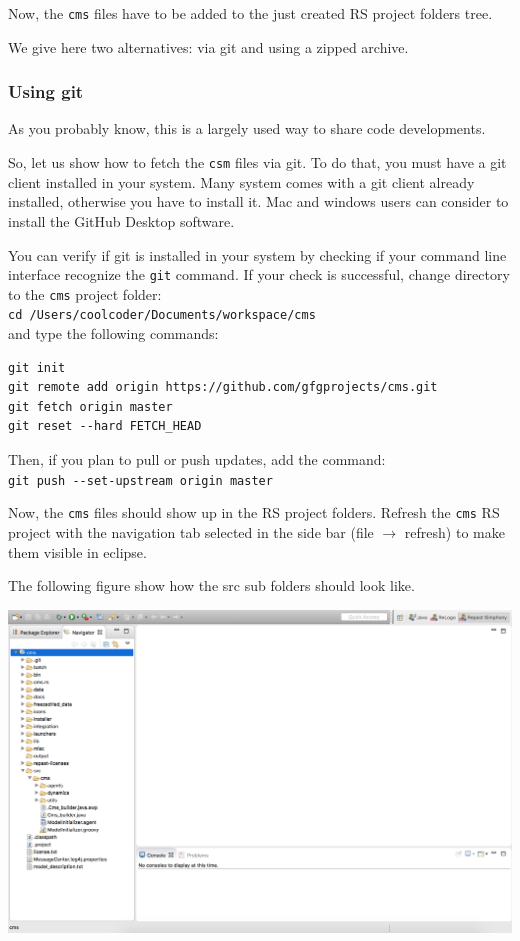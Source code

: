 \documentclass{article}
\begin{document}
\vskip2mm
Now, the \verb+cms+ files have to be added to the just created RS project folders tree.

We give here two alternatives: via git and using a zipped archive.

\subsubsection{Using git}

As you probably know, this is a largely used way to share code developments.

So, let us show how to fetch the \verb+csm+ files via git. To do that, you must have a git client installed in your system. Many system comes with a git client already installed, otherwise you have to install it. Mac and windows users can consider to install the GitHub Desktop software.

You can verify if git is installed in your system by checking if your command line interface recognize the \verb+git+ command.  
If your check is successful, change directory to the \verb+cms+ project folder:\\
\verb+cd /Users/coolcoder/Documents/workspace/cms+\\
and type the following commands:
\begin{verbatim}
git init
git remote add origin https://github.com/gfgprojects/cms.git
git fetch origin master
git reset --hard FETCH_HEAD
\end{verbatim}

Then, if you plan to pull or push updates, add the command:\\
\verb+git push --set-upstream origin master+

Now, the \verb+cms+ files should show up in the RS project folders.
Refresh the \verb+cms+ RS project with the navigation tab selected in the side bar (file $\rightarrow$ refresh) to make them visible in eclipse.

The following figure show how the src sub folders should look like.

\vskip2mm
\noindent
\includegraphics[scale=0.35]{fig_cms_rs_navigation1}
\end{document}
